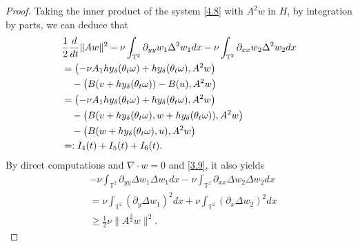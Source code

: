 \documentclass[10pt,a4paper]{amsart}
\renewcommand{\d}{{\rm{d}}}
\begin{document}
\begin{proof}

Taking the inner product of the system   \eqref{4.8} with $A^2w$ in $H$,  by integration by parts, we can deduce that
\begin{align}\label{4.17}
 &\frac12\frac{\d}{\d t}\|Aw\|^2- \nu \int_{\mathbb{T}^2}\partial_{yy}w_1\Delta^2 w_1dx-\nu \int_{\mathbb{T}^2}\partial_{xx}w_2\Delta^2 w_2dx\nonumber \\
&= \left(-\nu A_1hy_\delta(\theta_t\omega) +hy_\delta(\theta_t\omega),A^2w \right) \nonumber \\
&\quad -\left(B(\textbf{v}+hy_\delta(\theta_t\omega)) -B(\textbf{u}),A^2w \right)\nonumber\\
&=  \left(-\nu A_1hy_\delta(\theta_t\omega) +hy_\delta(\theta_t\omega),A^2w \right)\nonumber\\
&\quad -\left(B(\textbf{v}+hy_\delta(\theta_t\omega),w+hy_\delta(\theta_t\omega)),A^2w \right )\nonumber\\
&\quad
-\left(B(w+hy_\delta(\theta_t\omega),\textbf{u}),A^2w \right )\nonumber\\
&=: I_{4}(t)+I_{5}(t)+I_{6}(t).
\end{align}
By direct computations and $\nabla\cdot w=0$ and \eqref{3.9}, it also yields
\begin{align}
&-\nu \int_{\mathbb{T}^2}\partial_{yy}\Delta w_1\Delta w_1dx-\nu \int_{\mathbb{T}^2}\partial_{xx}\Delta w_2\Delta w_2dx\nonumber\\
&= \nu \int_{\mathbb{T}^2}(\partial_{y}\Delta w_1)^2dx
+\nu \int_{\mathbb{T}^2}(\partial_{x}\Delta w_2)^2dx
\nonumber\\
&\geq\frac12\nu\|A^{\frac32} w\|^2.
\end{align}


\end{proof}
\end{document}
